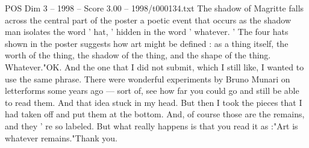 \begin{textsample}{POS Dim 3 – 1998 – Score 3.00 – 1998/t000134.txt}
The shadow of Magritte falls across the central part of the poster a poetic event that occurs as the shadow man isolates the word ' hat, ' hidden in the word ' whatever. ' The four hats shown in the poster suggests how art might be defined : as a thing itself, the worth of the thing, the shadow of the thing, and the shape of the thing.
Whatever."OK.
And the one that I did not submit, which I still like, I wanted to use the same phrase.
There were wonderful experiments by Bruno Munari on letterforms some years ago — sort of, see how far you could go and still be able to read them.
And that idea stuck in my head.
But then I took the pieces that I had taken off and put them at the bottom.
And, of course those are the remains, and they ' re so labeled.
But what really happens is that you read it as :"Art is whatever remains."Thank you.

\end{textsample}
